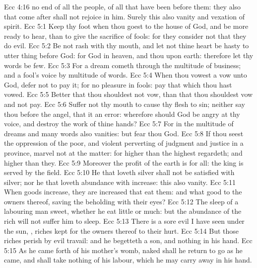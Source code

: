 \vs Ecc 4:16  no end of all the people,  of all that have been before them: they also that come after shall not rejoice in him. Surely this also  vanity and vexation of spirit.
\vs Ecc 5:1 Keep thy foot when thou goest to the house of God, and be more ready to hear, than to give the sacrifice of fools: for they consider not that they do evil.
\vs Ecc 5:2 Be not rash with thy mouth, and let not thine heart be hasty to utter  thing before God: for God  in heaven, and thou upon earth: therefore let thy words be few.
\vs Ecc 5:3 For a dream cometh through the multitude of business; and a fool's voice  by multitude of words.
\vs Ecc 5:4 When thou vowest a vow unto God, defer not to pay it; for  no pleasure in fools: pay that which thou hast vowed.
\vs Ecc 5:5 Better  that thou shouldest not vow, than that thou shouldest vow and not pay.
\vs Ecc 5:6 Suffer not thy mouth to cause thy flesh to sin; neither say thou before the angel, that it  an error: wherefore should God be angry at thy voice, and destroy the work of thine hands?
\vs Ecc 5:7 For in the multitude of dreams and many words  also  vanities: but fear thou God.
\vs Ecc 5:8 If thou seest the oppression of the poor, and violent perverting of judgment and justice in a province, marvel not at the matter: for  higher than the highest regardeth; and  higher than they.
\vs Ecc 5:9 Moreover the profit of the earth is for all: the king  is served by the field.
\vs Ecc 5:10 He that loveth silver shall not be satisfied with silver; nor he that loveth abundance with increase: this  also vanity.
\vs Ecc 5:11 When goods increase, they are increased that eat them: and what good  to the owners thereof, saving the beholding  with their eyes?
\vs Ecc 5:12 The sleep of a labouring man  sweet, whether he eat little or much: but the abundance of the rich will not suffer him to sleep.
\vs Ecc 5:13 There is a sore evil  I have seen under the sun, , riches kept for the owners thereof to their hurt.
\vs Ecc 5:14 But those riches perish by evil travail: and he begetteth a son, and  nothing in his hand.
\vs Ecc 5:15 As he came forth of his mother's womb, naked shall he return to go as he came, and shall take nothing of his labour, which he may carry away in his hand.
